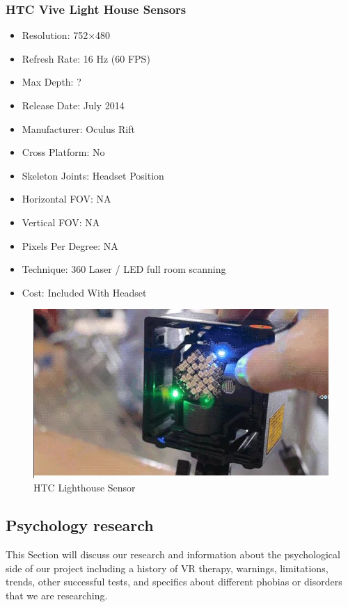 \documentclass[a4paper,10pt]{article}
\begin{document}
	\subsubsection{HTC Vive Light House Sensors}
\begin{itemize}
  \item Resolution: 752×480
  \item Refresh Rate: 16 Hz (60 FPS)
  \item Max Depth: ?
  \item Release Date: July 2014
  \item Manufacturer: Oculus Rift
  \item Cross Platform: No
  \item Skeleton Joints: Headset Position
  \item Horizontal FOV: NA
  \item Vertical FOV: NA
  \item Pixels Per Degree: NA
  \item Technique: 360 Laser / LED full room scanning 
  \item Cost: Included With Headset
\end{itemize}
\begin{figure}[H]
	\includegraphics[width=\linewidth,height=\paperheight,keepaspectratio]{viveLight.jpg}
	\caption{HTC Lighthouse Sensor}
	\label{fig:viveCam}
	\end{figure}
	\pagebreak

\subsection {Psychology research}
This Section will discuss our research and information about the psychological side of our project including a history of VR therapy, warnings, limitations, trends, other successful tests, and specifics about different phobias or disorders that we are researching. 
\end{document}
